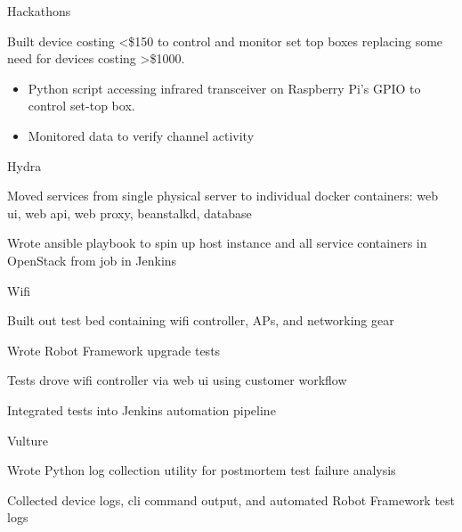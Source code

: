 
\begin{cventries}
  \cventry
    {} {Hackathons} {} {} {
      \begin{cvitems}
      \item {Built device costing <\$150 to control and monitor set top boxes replacing some need for devices costing >\$1000.}
        \begin{itemize}
        \item {Python script accessing infrared transceiver on Raspberry Pi's GPIO to control set-top box.}
        \item {Monitored data to verify channel activity}
        \end{itemize}
      \end{cvitems}
    }

  \cventry
    {} {Hydra} {} {} {
      \begin{cvitems} %
      \item {Moved services from single physical server to individual docker containers: web ui, web api, web proxy, beanstalkd, database}
      \item {Wrote ansible playbook to spin up host instance and all service containers in OpenStack from job in Jenkins}
      \end{cvitems}
    }

  \cventry
    {} {Wifi} {} {} {
      \begin{cvitems} %
      \item {Built out test bed containing wifi controller, APs, and networking gear}
      \item {Wrote Robot Framework upgrade tests}
      \item {Tests drove wifi controller via web ui using customer workflow}
      \item {Integrated tests into Jenkins automation pipeline}
      \end{cvitems}
    }

  \cventry
    {} {Vulture} {} {} {
      \begin{cvitems} %
      \item {Wrote Python log collection utility for postmortem test failure analysis}
      \item {Collected device logs, cli command output, and automated Robot Framework test logs}
      \end{cvitems}
    }

\end{cventries}

